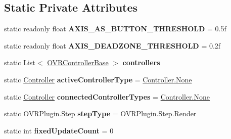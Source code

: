 \subsection*{Static Private Attributes}
\begin{DoxyCompactItemize}
\item 
\mbox{\label{class_o_v_r_input_aa6f8e8d6dd18d619d04f6ce066e6e480}} 
static readonly float {\bfseries A\+X\+I\+S\+\_\+\+A\+S\+\_\+\+B\+U\+T\+T\+O\+N\+\_\+\+T\+H\+R\+E\+S\+H\+O\+LD} = 0.\+5f
\item 
\mbox{\label{class_o_v_r_input_a54ee97ea23af605bfa5f544c2c1bc69b}} 
static readonly float {\bfseries A\+X\+I\+S\+\_\+\+D\+E\+A\+D\+Z\+O\+N\+E\+\_\+\+T\+H\+R\+E\+S\+H\+O\+LD} = 0.\+2f
\item 
\mbox{\label{class_o_v_r_input_a6499c54218dcada8227dc91395f9ccaf}} 
static List$<$ \mbox{\hyperlink{class_o_v_r_input_1_1_o_v_r_controller_base}{O\+V\+R\+Controller\+Base}} $>$ {\bfseries controllers}
\item 
\mbox{\label{class_o_v_r_input_a955a3090518783b31ed14b690e7d8dc1}} 
static \mbox{\hyperlink{class_o_v_r_input_a5c86f9052a9cbb0b73779ff5704d60a8}{Controller}} {\bfseries active\+Controller\+Type} = \mbox{\hyperlink{class_o_v_r_input_a5c86f9052a9cbb0b73779ff5704d60a8a6adf97f83acf6453d4a6a4b1070f3754}{Controller.\+None}}
\item 
\mbox{\label{class_o_v_r_input_a8a5770c43ae13f462326e4211ea577cf}} 
static \mbox{\hyperlink{class_o_v_r_input_a5c86f9052a9cbb0b73779ff5704d60a8}{Controller}} {\bfseries connected\+Controller\+Types} = \mbox{\hyperlink{class_o_v_r_input_a5c86f9052a9cbb0b73779ff5704d60a8a6adf97f83acf6453d4a6a4b1070f3754}{Controller.\+None}}
\item 
\mbox{\label{class_o_v_r_input_ab842ec71204e4043a104ba2937d8ccd1}} 
static O\+V\+R\+Plugin.\+Step {\bfseries step\+Type} = O\+V\+R\+Plugin.\+Step.\+Render
\item 
\mbox{\label{class_o_v_r_input_a57a8681707fec13a0aa3238c9b198dd2}} 
static int {\bfseries fixed\+Update\+Count} = 0
\item 
\mbox{\label{class_o_v_r_input_aeb8f15f051d550f2244434f0cecf25c2}} 

\end{DoxyCompactItemize}
